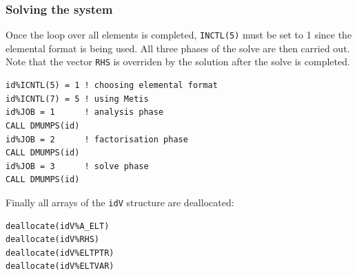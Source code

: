 \subsubsection{Solving the system}

Once the loop over all elements is completed, {\tt INCTL(5)}
must be set to 1 since the elemental format is being used. 
All three phases of the solve are then carried out. Note that the 
vector {\tt RHS} is overriden by the solution after the solve is completed.   

\begin{verbatim}
id%ICNTL(5) = 1 ! choosing elemental format
id%ICNTL(7) = 5 ! using Metis
id%JOB = 1      ! analysis phase 
CALL DMUMPS(id)
id%JOB = 2      ! factorisation phase 
CALL DMUMPS(id)
id%JOB = 3      ! solve phase
CALL DMUMPS(id)
\end{verbatim}

Finally all arrays of the {\tt idV} structure are deallocated:
\begin{verbatim}
deallocate(idV%A_ELT)
deallocate(idV%RHS)
deallocate(idV%ELTPTR)
deallocate(idV%ELTVAR)
\end{verbatim}


